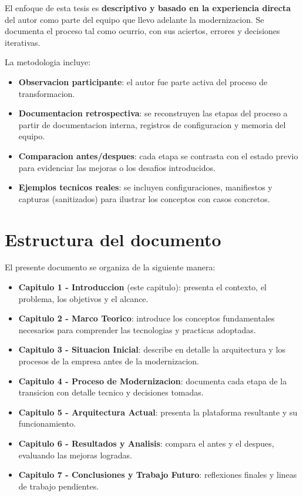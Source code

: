 El enfoque de esta tesis es \textbf{descriptivo y basado en la
experiencia directa} del autor como parte del equipo que llevo adelante
la modernizacion. Se documenta el proceso tal como ocurrio, con sus
aciertos, errores y decisiones iterativas.

La metodologia incluye:

\begin{itemize}
\tightlist
\item
  \textbf{Observacion participante}: el autor fue parte activa del
  proceso de transformacion.
\item
  \textbf{Documentacion retrospectiva}: se reconstruyen las etapas del
  proceso a partir de documentacion interna, registros de configuracion
  y memoria del equipo.
\item
  \textbf{Comparacion antes/despues}: cada etapa se contrasta con el
  estado previo para evidenciar las mejoras o los desafios introducidos.
\item
  \textbf{Ejemplos tecnicos reales}: se incluyen configuraciones,
  manifiestos y capturas (sanitizados) para ilustrar los conceptos con
  casos concretos.
\end{itemize}

\hypertarget{estructura-del-documento}{%
\section{Estructura del documento}\label{estructura-del-documento}}

El presente documento se organiza de la siguiente manera:

\begin{itemize}
\tightlist
\item
  \textbf{Capitulo 1 - Introduccion} (este capitulo): presenta el
  contexto, el problema, los objetivos y el alcance.
\item
  \textbf{Capitulo 2 - Marco Teorico}: introduce los conceptos
  fundamentales necesarios para comprender las tecnologias y practicas
  adoptadas.
\item
  \textbf{Capitulo 3 - Situacion Inicial}: describe en detalle la
  arquitectura y los procesos de la empresa antes de la modernizacion.
\item
  \textbf{Capitulo 4 - Proceso de Modernizacion}: documenta cada etapa
  de la transicion con detalle tecnico y decisiones tomadas.
\item
  \textbf{Capitulo 5 - Arquitectura Actual}: presenta la plataforma
  resultante y su funcionamiento.
\item
  \textbf{Capitulo 6 - Resultados y Analisis}: compara el antes y el
  despues, evaluando las mejoras logradas.
\item
  \textbf{Capitulo 7 - Conclusiones y Trabajo Futuro}: reflexiones
  finales y lineas de trabajo pendientes.
\end{itemize}
